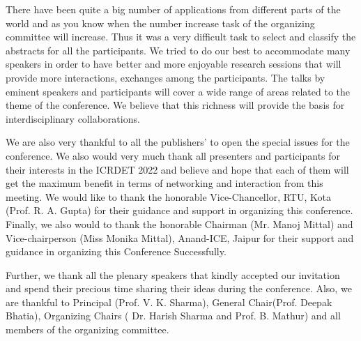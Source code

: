 \documentclass[twoside,11pt]{amsart}
\begin{document}
 There have been quite a big number of applications from different parts of the world and as you know when the number increase task of the organizing committee will increase. Thus it was a very difficult task to select and classify the abstracts for all the participants. We tried to do our best to accommodate many speakers in order to have better and more enjoyable research sessions that will provide more interactions, exchanges among the participants. The talks by eminent speakers and participants will cover a wide range of areas related to the theme of the conference.  We believe that this richness will provide the basis for interdisciplinary collaborations. 
 
 We are also very thankful to all the publishers' to open the special issues for the conference. We also would very much thank all presenters and participants for their interests in the ICRDET 2022 and believe and hope that each of them will get the maximum benefit in terms of networking and interaction from this meeting.
\vskip 1mm
\newpage
We would like to thank the honorable Vice-Chancellor, RTU, Kota (Prof. R. A. Gupta)  for their guidance and support in organizing this conference. Finally, we also would to thank the honorable Chairman (Mr. Manoj Mittal) and Vice-chairperson (Miss Monika Mittal), Anand-ICE, Jaipur for their support and guidance in organizing this Conference Successfully.

Further, we thank all the plenary speakers that kindly accepted our invitation and spend their precious time sharing their ideas during the conference. Also, we are thankful to Principal (Prof. V. K. Sharma), General Chair(Prof. Deepak Bhatia),  Organizing Chairs ( Dr. Harish Sharma and Prof. B. Mathur) and all members of the organizing committee.
\end{document}
